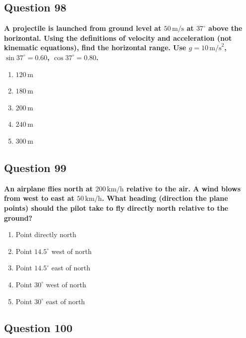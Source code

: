 \documentclass[12pt,letterpaper]{article}
\begin{document}
\subsection{Question 98}

\begin{questionbox}
\textbf{A projectile is launched from ground level at $50\,\text{m/s}$ at $37^\circ$ above the horizontal. Using the definitions of velocity and acceleration (not kinematic equations), find the horizontal range. Use $g = 10\,\text{m/s}^2$, $\sin 37^\circ = 0.60$, $\cos 37^\circ = 0.80$.}

\begin{enumerate}[label=\alph*)]
    \item $120\,\text{m}$
    \item $180\,\text{m}$
    \item $200\,\text{m}$
    \item $240\,\text{m}$
    \item $300\,\text{m}$
\end{enumerate}
\end{questionbox}

\subsection{Question 99}

\begin{questionbox}
\textbf{An airplane flies north at $200\,\text{km/h}$ relative to the air. A wind blows from west to east at $50\,\text{km/h}$. What heading (direction the plane points) should the pilot take to fly directly north relative to the ground?}

\begin{enumerate}[label=\alph*)]
    \item Point directly north
    \item Point $14.5^\circ$ west of north
    \item Point $14.5^\circ$ east of north
    \item Point $30^\circ$ west of north
    \item Point $30^\circ$ east of north
\end{enumerate}
\end{questionbox}

\subsection{Question 100}
\end{document}
